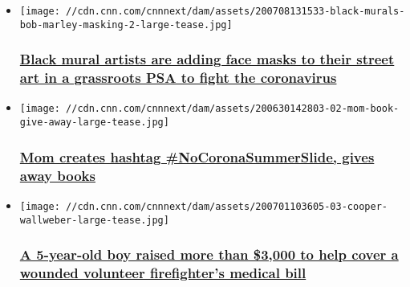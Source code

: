 \begin{itemize}
\item
  \href{/2020/07/09/us/black-mural-artists-covid-mask-coverup-iyw-trnd/index.html}{}

  \texttt{[image: //cdn.cnn.com/cnnnext/dam/assets/200708131533-black-murals-bob-marley-masking-2-large-tease.jpg]}

  \hypertarget{black-mural-artists-are-adding-face-masks-to-their-street-art-in-a-grassroots-psa-to-fight-the-coronavirus}{%
  \subsubsection{\texorpdfstring{\href{/2020/07/09/us/black-mural-artists-covid-mask-coverup-iyw-trnd/index.html}{Black
  mural artists are adding face masks to their street art in a
  grassroots PSA to fight the
  coronavirus}}{Black mural artists are adding face masks to their street art in a grassroots PSA to fight the coronavirus}}\label{black-mural-artists-are-adding-face-masks-to-their-street-art-in-a-grassroots-psa-to-fight-the-coronavirus}}
\item
  \href{/2020/07/01/us/iyw-mom-giving-away-books-creates-hashtag-nocoronasummerslide-trnd/index.html}{}

  \texttt{[image: //cdn.cnn.com/cnnnext/dam/assets/200630142803-02-mom-book-give-away-large-tease.jpg]}

  \hypertarget{mom-creates-hashtag-nocoronasummerslide-gives-away-books-}{%
  \subsubsection{\texorpdfstring{\href{/2020/07/01/us/iyw-mom-giving-away-books-creates-hashtag-nocoronasummerslide-trnd/index.html}{Mom
  creates hashtag \#NoCoronaSummerSlide, gives away books
  }}{Mom creates hashtag \#NoCoronaSummerSlide, gives away books }}\label{mom-creates-hashtag-nocoronasummerslide-gives-away-books-}}
\item
  \href{/2020/07/02/us/iyw-community-supports-injured-firefighter-trnd/index.html}{}

  \texttt{[image: //cdn.cnn.com/cnnnext/dam/assets/200701103605-03-cooper-wallweber-large-tease.jpg]}

  \hypertarget{a-5-year-old-boy-raised-more-than-3000-to-help-cover-a-wounded-volunteer-firefighters-medical-bill}{%
  \subsubsection{\texorpdfstring{\href{/2020/07/02/us/iyw-community-supports-injured-firefighter-trnd/index.html}{A
  5-year-old boy raised more than \$3,000 to help cover a wounded
  volunteer firefighter's medical
  bill}}{A 5-year-old boy raised more than \$3,000 to help cover a wounded volunteer firefighter's medical bill}}\label{a-5-year-old-boy-raised-more-than-3000-to-help-cover-a-wounded-volunteer-firefighters-medical-bill}}
\end{itemize}

